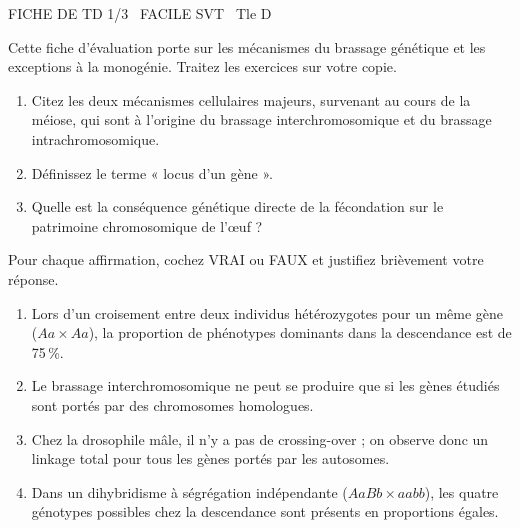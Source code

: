 \documentclass[11pt]{article}
\begin{document}
\begin{tcolorbox}[enhanced,colback=popink,colframe=popink,arc=10pt,boxrule=0pt,left=12pt,right=12pt,top=9pt,bottom=9pt]
{\color{white}\popxbold\small FICHE DE TD 1/3 \textbullet\ FACILE \hfill SVT \textbullet\ Tle D\par}
\end{tcolorbox}
\vspace{4pt}
Cette fiche d'évaluation porte sur les mécanismes du brassage génétique et les exceptions à la monogénie. Traitez les exercices sur votre copie.

\begin{exercice}
\begin{enumerate}
    \item Citez les deux mécanismes cellulaires majeurs, survenant au cours de la méiose, qui sont à l'origine du brassage interchromosomique et du brassage intrachromosomique.
    \item Définissez le terme « locus d'un gène ».
    \item Quelle est la conséquence génétique directe de la fécondation sur le patrimoine chromosomique de l'œuf ?
\end{enumerate}
\end{exercice}

\begin{exercice}
Pour chaque affirmation, cochez VRAI ou FAUX et justifiez brièvement votre réponse.
\begin{enumerate}
    \item Lors d'un croisement entre deux individus hétérozygotes pour un même gène ($Aa \times Aa$), la proportion de phénotypes dominants dans la descendance est de 75\,\%.
    \item Le brassage interchromosomique ne peut se produire que si les gènes étudiés sont portés par des chromosomes homologues.
    \item Chez la drosophile mâle, il n'y a pas de crossing-over ; on observe donc un linkage total pour tous les gènes portés par les autosomes.
    \item Dans un dihybridisme à ségrégation indépendante ($AaBb \times aabb$), les quatre génotypes possibles chez la descendance sont présents en proportions égales.
\end{enumerate}
\end{exercice}
\end{document}
